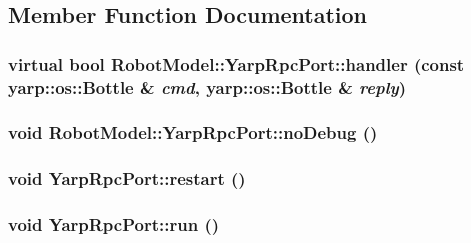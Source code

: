 \subsection{Member Function Documentation}
\hypertarget{class_robot_model_1_1_yarp_rpc_port_a156879aeb8b6641c0f63a6633af8c568}{
\subsubsection[{handler}]{\setlength{\rightskip}{0pt plus 5cm}virtual bool RobotModel::YarpRpcPort::handler (const yarp::os::Bottle \& {\em cmd}, \/  yarp::os::Bottle \& {\em reply})}}
\label{class_robot_model_1_1_yarp_rpc_port_a156879aeb8b6641c0f63a6633af8c568}
\hypertarget{class_robot_model_1_1_yarp_rpc_port_a87e299eb43783a25cd71def0e50eb9dc}{
\subsubsection[{noDebug}]{\setlength{\rightskip}{0pt plus 5cm}void RobotModel::YarpRpcPort::noDebug ()}}
\label{class_robot_model_1_1_yarp_rpc_port_a87e299eb43783a25cd71def0e50eb9dc}
\hypertarget{class_robot_model_1_1_yarp_rpc_port_a93d242e15bb04534f7db4fe6636a0086}{
\subsubsection[{restart}]{\setlength{\rightskip}{0pt plus 5cm}void YarpRpcPort::restart ()}}
\label{class_robot_model_1_1_yarp_rpc_port_a93d242e15bb04534f7db4fe6636a0086}
\hypertarget{class_robot_model_1_1_yarp_rpc_port_a3e4c1be7ae685d9478b38d71255b1bcd}{
\subsubsection[{run}]{\setlength{\rightskip}{0pt plus 5cm}void YarpRpcPort::run ()}}
